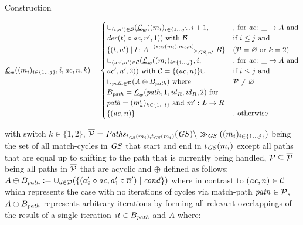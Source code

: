 \begin{paragraph}{Construction}
\begin{center}
	$\underline{\Lang}_w((m_i)_{i \in \{1\ldots j\}},i,\ac,n,k)=\begin{cases}
	\cup_{(t,n') \in \mathcal{B}}(\underline{\Lang}_w((m_i)_{i \in \{1\ldots j\}}, i+1, & \text{, for } \ac\colon \_ \to A \text{ and}\\
	\der(t)\circ \ac,n',1)) \text{ with } \mathcal{B}= & \text{if } i \leq j \text{ and }\\
	\{(t,n') \mid t\colon A \Trans{(s_\GS(m_i),m_i,n)}_{\GS,n'} B\} & (\Pset = \varnothing \text{ or } k=2)\\
	\cup_{(\ac',n') \in \mathcal{C}}(\underline{\Lang}_w((m_i)_{i \in \{1\ldots j\}},i, & \text{, for } \ac\colon \_ \to A \text{ and}\\
	\ac',n',2)) \text{ with } \mathcal{C}=\{(\ac,n)\} \cup & \text{if } i \leq j \text{ and }\\
	\cup_{\paths \in \Pset}(A \oplus B_\paths) \text{ where } & \Pset \neq \varnothing\\
	B_\paths=\underline{\Lang}_w(\paths,1,\id_R,\id_R,2) \text{ for} & \\
	\paths=(m'_k)_{k \in \{1\ldots l\}} \text{ and } m'_1\colon L \to R & \\
	\{(\ac,n)\} & \text{, otherwise}\\
	\end{cases}$
\end{center}
with switch $k \in \{1,2\}$, $\overline{{\cal P}}=\mathit{Paths}_{t_\mathit{GS}(m_i),t_\mathit{GS}(m_i)}(\mathit{GS}) \setminus \gg_\mathit{GS}((m_i)_{i \in \{1\ldots j\}})$ being the set of all match-cycles in $\mathit{GS}$ that start and end in $t_\mathit{GS}(m_i)$ except all paths that are equal up to shifting to the path that is currently being handled, ${\cal P} \subseteq \overline{{\cal P}}$ being all paths in $\overline{{\cal P}}$ that are acyclic and $\oplus$ defined as follows:
$A \oplus B_\mathit{path}:=\cup_{d \in \mathcal{D}}(\{(a'_2 \circ \mathit{ac},a'_1 \circ \overline{n}') \mid \mathit{cond}\})$ where in contrast to $(\mathit{ac},n) \in \mathcal{C}$ which represents the case with no iterations of cycles via match-path $\mathit{path} \in {\cal P}$, $A \oplus B_\mathit{path}$ represents arbitrary iterations by forming all relevant overlappings of the result of a single iteration $\mathit{it} \in B_\mathit{path}$ and $A$ where:
\begin{center}
\end{center}
\end{paragraph}
